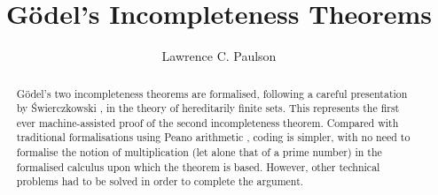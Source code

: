 \documentclass[11pt,a4paper]{report}
\begin{document}
\title{G\"odel's Incompleteness Theorems}
\author{Lawrence C. Paulson}
\maketitle

\begin{abstract}
G\"odel's two incompleteness theorems \cite{goedel-I} are formalised, following a careful presentation by {\'S}wierczkowski \cite{swierczkowski-finite}, in the theory of hereditarily finite sets. This represents the first ever machine-assisted proof of the second incompleteness theorem. Compared with traditional formalisations using Peano arithmetic \cite{boolos-provability}, coding is simpler, with no need to formalise the notion of multiplication (let alone that of a prime number) in the formalised calculus upon which the theorem is based.
However, other technical problems had to be solved in order to complete the argument.
\end{abstract}

\tableofcontents





\end{document}
